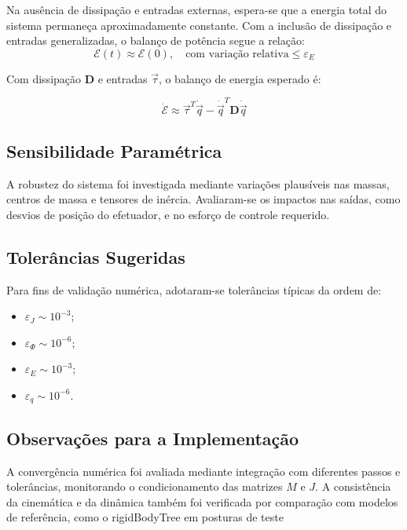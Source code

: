 Na ausência de dissipação e entradas externas, espera-se que a energia total do sistema permaneça aproximadamente constante. Com a inclusão de dissipação e entradas generalizadas, o balanço de potência segue a relação:
\begin{equation}
\mathcal{E}(t) \approx \mathcal{E}(0), \quad \text{com variação relativa} \leq \varepsilon_E
\label{eq:energia_constante}
\end{equation}

Com dissipação $ \mathbf{D} $ e entradas $ \vec{\tau} $, o balanço de energia esperado é:

\begin{equation}
\dot{\mathcal{E}} \approx \vec{\tau}^T \dot{\vec{q}} - \dot{\vec{q}}^T \mathbf{D} \dot{\vec{q}}
\label{eq:balanco_energia}
\end{equation}

\subsection{Sensibilidade Paramétrica}

A robustez do sistema foi investigada mediante variações plausíveis nas massas, centros de massa e tensores de inércia. Avaliaram-se os impactos nas saídas, como desvios de posição do efetuador, e no esforço de controle requerido.

\subsection{Tolerâncias Sugeridas}

Para fins de validação numérica, adotaram-se tolerâncias típicas da ordem de:

\begin{itemize}
\item $ \varepsilon_J \sim 10^{-3} $;
\item $ \varepsilon_\Phi \sim 10^{-6} $;
\item $ \varepsilon_E \sim 10^{-3} $;
\item $ \varepsilon_q \sim 10^{-6} $.
\end{itemize}

\subsection{Observações para a Implementação}

A convergência numérica foi avaliada mediante integração com diferentes passos e tolerâncias, monitorando o condicionamento das matrizes $M$ e $J$. A consistência da cinemática e da dinâmica também foi verificada por comparação com modelos de referência, como o rigidBodyTree em posturas de teste
